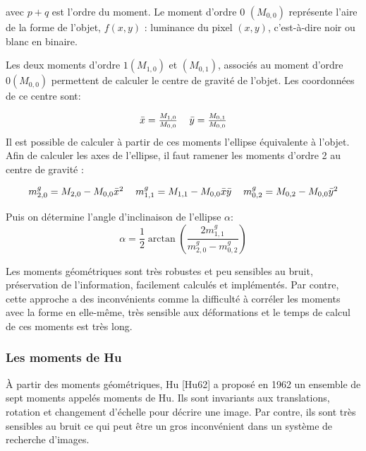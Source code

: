 avec $p+q$ est l'ordre du moment. Le moment d’ordre 0 $(M_{0,0})$  représente l’aire de la forme de l'objet, $f(x, y)$ : luminance du pixel $(x, y)$, c’est-à-dire noir ou blanc en binaire.

Les deux moments d'ordre $1 (M_{1,0})$ et $(M_{0,1})$, associés au moment d’ordre $0 (M_{0,0})$ permettent de calculer le centre de gravité de l'objet. Les coordonnées de ce
centre sont:

\begin{equation}
		\begin{tabular}{cc}
		$\bar{x} = \frac{M_{1,0}}{M_{0,0}}$ & $\bar{y} = \frac{M_{0,1}}{M_{0,0}}$
		\end{tabular}
\end{equation}
Il est possible de calculer à partir de ces moments l’ellipse équivalente à l’objet. Afin de calculer les axes de l’ellipse, il faut ramener les moments d’ordre 2 au centre de gravité :

\begin{equation}
\begin{tabular}{ccc}
$m_{2, 0}^g = M_{2,0} - M_{0,0} \bar{x}^2$ & $m_{1,1}^g = M_{1,1} - M_{0,0} \bar{x}\bar{y}$ 
& $m_{0,2}^g = M_{0,2} - M_{0,0} \bar{y}^2$ 
\end{tabular}
\end{equation}

Puis on détermine l’angle d’inclinaison de l’ellipse $\alpha$:
\begin{equation}
    \alpha = \frac{1}{2} \arctan(\frac{2m_{1,1}^g}{m_{2, 0}^g-m_{0,2}^g})
\end{equation}

Les moments géométriques sont très robustes et peu sensibles au bruit, préservation de l’information, facilement calculés et implémentés. Par contre, cette approche a des inconvénients comme la difficulté à corréler les moments avec la forme en elle-même, très sensible aux déformations et le temps de calcul de ces moments est très long.

\subsubsection{Les  moments de Hu}
À partir des moments géométriques, Hu [Hu62] a proposé en 1962 un ensemble de sept moments appelés moments de Hu. Ils sont invariants aux translations, rotation et changement d’échelle pour décrire une image. Par contre, ils sont très sensibles au bruit ce qui peut être un gros inconvénient dans un système de recherche d’images.\\


